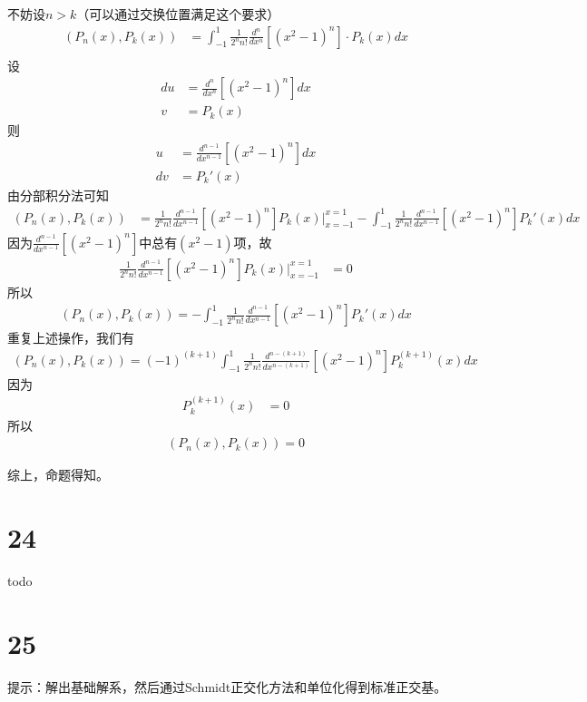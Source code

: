 \documentclass{article}
\begin{document}
不妨设$n > k$（可以通过交换位置满足这个要求）
\begin{align*}
  (P_{n}(x), P_k(x))
   & = \int_{-1}^{1} \frac{1}{2^n n!} \frac{d^n}{d x^n}[(x^2 - 1)^n] \cdot P_k(x) dx \\
\end{align*}
设
\begin{align*}
  du & = \frac{d^n}{d x^n}[(x^2 - 1)^n] dx \\
  v  & = P_k(x)
\end{align*}
则
\begin{align*}
  u  & = \frac{d^{n - 1}}{d x^{n - 1}}[(x^2 - 1)^n] dx \\
  dv & = P_k'(x)
\end{align*}
由分部积分法可知
\begin{align*}
  (P_{n}(x), P_k(x))
   & = \frac{1}{2^n n!} \frac{d^{n - 1}}{d x^{n - 1}}[(x^2 - 1)^n] P_k(x) \bigg|_{x = -1}^{x = 1}
  -  \int_{-1}^{1} \frac{1}{2^n n!} \frac{d^{n - 1}}{d x^{n - 1}}[(x^2 - 1)^n] P_k'(x) dx
\end{align*}
因为$\frac{d^{n - 1}}{d x^{n - 1}}[(x^2 - 1)^n]$中总有$(x^2 - 1)$项，故
\begin{align*}
  \frac{1}{2^n n!} \frac{d^{n - 1}}{d x^{n - 1}}[(x^2 - 1)^n] P_k(x) \bigg|_{x = -1}^{x = 1}
   & = 0
\end{align*}
所以
\begin{align*}
  (P_{n}(x), P_k(x)) = -  \int_{-1}^{1} \frac{1}{2^n n!} \frac{d^{n - 1}}{d x^{n - 1}}[(x^2 - 1)^n] P_k'(x) dx
\end{align*}
重复上述操作，我们有
\begin{align*}
  (P_{n}(x), P_k(x)) = (-1)^{(k+1)}  \int_{-1}^{1} \frac{1}{2^n n!} \frac{d^{n - (k+1)}}{d x^{n - (k+1)}}[(x^2 - 1)^n] P_k^{(k+1)}(x) dx
\end{align*}
因为
\begin{align*}
  P_k^{(k+1)}(x)
  & = 0
\end{align*}
所以
\begin{align*}
  (P_{n}(x), P_k(x)) = 0
\end{align*}

综上，命题得知。

\section*{24}

todo

\section*{25}

提示：解出基础解系，然后通过Schmidt正交化方法和单位化得到标准正交基。
\end{document}
